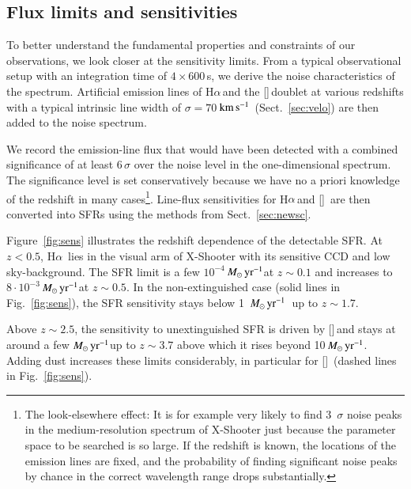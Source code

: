 \documentclass[traditabstract, longauth]{aa}
\newcommand{\kms}{$\rm{km\,s^{-1}}$}
\newcommand{\ha}{H$\alpha$}
\newcommand{\oii}{[\ion{O}{ii}]}
\newcommand{\Msunyr}{$M_\odot\,\rm{yr}^{-1}$}
\begin{document}
\subsection{Flux limits and sensitivities}
\label{sec:sens}

To better understand the fundamental properties and constraints of our observations, we look closer at the sensitivity limits. From a typical observational setup with an integration time of $4\times600$\,s, we derive the noise characteristics of the spectrum. Artificial emission lines of \ha\,and the \oii\,doublet at various redshifts with a typical intrinsic line width of $\sigma= 70$\,\kms\, (Sect.~\ref{sec:velo}) are then added to the noise spectrum. 

We record the emission-line flux that would have been detected with a combined significance of at least 6\,$\sigma$ over the noise level in the one-dimensional spectrum. The significance level is set conservatively because we have no a priori knowledge of the redshift in many cases\footnote{The look-elsewhere effect: It is for example very likely to find 3~$\sigma$ noise peaks in the medium-resolution spectrum of X-Shooter just because the parameter space to be searched is so large. If the redshift is known, the locations of the emission lines are fixed, and the probability of finding significant noise peaks by chance in the correct wavelength range drops substantially.}. Line-flux sensitivities for \ha\,and \oii\, are then converted into SFRs using the methods from Sect.~\ref{sec:newsc}.

Figure~\ref{fig:sens} illustrates the redshift dependence of the detectable SFR. At $z<0.5$, \ha\, lies in the visual arm of X-Shooter with its sensitive CCD and low sky-background. The SFR limit is a few $10^{-4}$\,\Msunyr at $z\sim0.1$ and increases to $8\cdot10^{-3}$\,\Msunyr at $z\sim0.5$. In the non-extinguished case (solid lines in Fig.~\ref{fig:sens}), the SFR sensitivity stays below 1~\Msunyr\, up to $z\sim1.7$.

Above $z\sim2.5$, the sensitivity to unextinguished SFR is driven by \oii\,and stays at around a few \Msunyr up to $z\sim3.7$ above which it rises beyond 10\,\Msunyr. Adding dust increases these limits considerably, in particular for \oii\, (dashed lines in Fig.~\ref{fig:sens}). 
\end{document}
